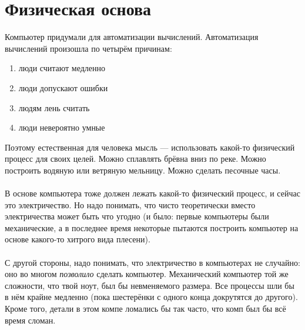 \documentclass[11pt]{book}
\begin{document}
\section{Физическая основа}
Компьютер придумали для автоматизации вычислений. Автоматизация
вычислений произошла по четырём причинам:
\begin{enumerate}
\item люди считают медленно
\item люди допускают ошибки
\item людям лень считать
\item люди невероятно умные
\end{enumerate}
Поэтому естественная для человека мысль --- использовать какой-то
физический процесс для своих целей. Можно сплавлять брёвна вниз по реке.
Можно построить водяную или ветряную мельницу. Можно сделать песочные часы.
\\ \\
В основе компьютера тоже должен лежать какой-то физический процесс,
и сейчас это электричество. Но надо понимать, что чисто теоретически вместо
электричества может быть что угодно (и было: первые компьютеры были механические,
а в последнее время некоторые пытаются построить компьютер на основе какого-то
хитрого вида плесени).
\\ \\
С другой стороны, надо понимать, что электричество в компьютерах не случайно:
оно во многом \emph{позволило} сделать компьютер. Механический компьютер
той же сложности, что твой ноут, был бы невменяемого размера.
Все процессы шли бы в нём крайне медленно (пока шестерёнки с одного
конца докрутятся до другого). Кроме того, детали в этом компе ломались бы так часто,
что комп был бы всё время сломан.
\end{document}
